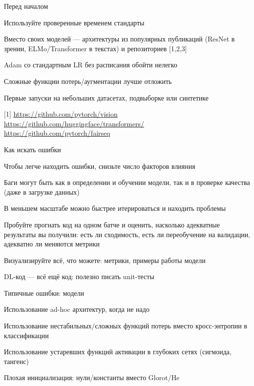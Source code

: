 \documentclass[notes,12pt, aspectratio=169]{beamer}
\newenvironment{wideitemize}{\itemize\addtolength{\itemsep}{10pt}}{\enditemize}
\begin{document}
\begin{frame}{Перед началом}
	\begin{wideitemize}
		\item  Используйте проверенные временем стандарты
		\item  Вместо своих моделей — архитектуры из популярных публикаций  (ResNet в зрении, ELMo/Transformer в текстах) и репозиториев [1,2,3]
		\item Adam со стандартным LR без расписания обойти нелегко
		\item Сложные функции потерь/аугментации лучше отложить
		\item Первые запуски на небольших датасетах, подвыборке или синтетике
	\end{wideitemize}

\vfill
\footnotesize
{\color{blue} [1] \url{https://github.com/pytorch/vision}  \newline
[2] \url{https://github.com/huggingface/transformers/}   \newline
[3] \url{https://github.com/pytorch/fairseq}} 

\end{frame}


\begin{frame}{Как искать ошибки}
	\begin{wideitemize}	
		\item Чтобы легче находить ошибки, снизьте число факторов влияния 
		
		\item  Баги могут быть как в определении и обучении модели, так и в проверке качества (даже в загрузке данных)
		
		\item В меньшем масштабе можно быстрее итерироваться и находить проблемы
		
		\item \alert{Пробуйте прогнать код на одном батче и оценить, насколько адекватные результаты вы получили:} есть ли сходимость, есть ли переобучение на валидации, адекватно ли меняются метрики 
		
		\item Визуализируйте всё, что можете: метрики, примеры работы модели
		
		\item DL-код — всё ещё код: полезно писать unit-тесты
	\end{wideitemize}
\end{frame}



\begin{frame}{Типичные ошибки: модели}
	\begin{wideitemize}
		\item Использование ad-hoc архитектур, когда не надо
		\item Использование нестабильных/сложных функций потерь вместо кросс-энтропии в классификации 
		\item Использование устаревших функций активации в глубоких сетях (сигмоида, тангенс)
		\item Плохая инициализация: нули/константы вместо Glorot/He
	\end{wideitemize}
\end{frame}
\end{document}
